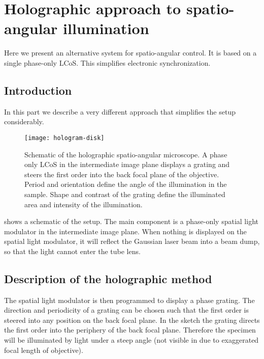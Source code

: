 \chapter{Holographic approach to spatio-angular illumination}
\label{sec:app_holo}
\begin{summary}
  Here we present an alternative system for spatio-angular control. It
  is based on a single phase-only LCoS. This simplifies electronic
  synchronization.
\end{summary}

\section{Introduction}
In this part we describe a very different approach that simplifies the
setup considerably.

\begin{figure}[!hbt]
  \centering
  
  \texttt{[image: hologram-disk]}
  \caption{Schematic of the holographic spatio-angular microscope. A
    phase only LCoS in the intermediate image plane displays a grating
    and steers the first order into the back focal plane of the
    objective. Period and orientation define the angle of the
    illumination in the sample. Shape and contrast of the grating
    define the illuminated area and intensity of the illumination.}
  \label{fig:holo-setup3}
\end{figure}

 shows a schematic of the setup. The main
component is a phase-only spatial light modulator in the intermediate
image plane. When nothing is displayed on the spatial light modulator,
it will reflect the Gaussian laser beam into a beam dump, so that
the light cannot enter the tube lens.

\section{Description of the holographic method}
The spatial light modulator is then programmed to display a phase
grating.  The direction and periodicity of a grating can be chosen
such that the first order is steered into any position on the back
focal plane. In the sketch the grating directs the first order into
the periphery of the back focal plane. Therefore the specimen will be
illuminated by light under a steep angle (not visible in
 due to exaggerated focal length of
objective).

